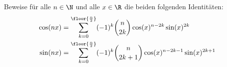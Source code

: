 \begin{prob}
  Beweise für alle $n \in \N$ und alle $x \in \R$ die beiden folgenden
  Identitäten:
  \begin{equation*}
    \begin{split}
      \cos(nx) &= \sum_{k=0}^{\floor{\frac{n}{2}}} (-1)^k\binom{n}{2k} \cos(x)^{n-2k}\sin(x)^{2k}\\
      \sin(nx) &= \sum_{k=0}^{\floor{\frac{n}{2}}} (-1)^k\binom{n}{2k+1} \cos(x)^{n-2k-1}\sin(x)^{2k+1}
    \end{split}
  \end{equation*}
\end{prob}
